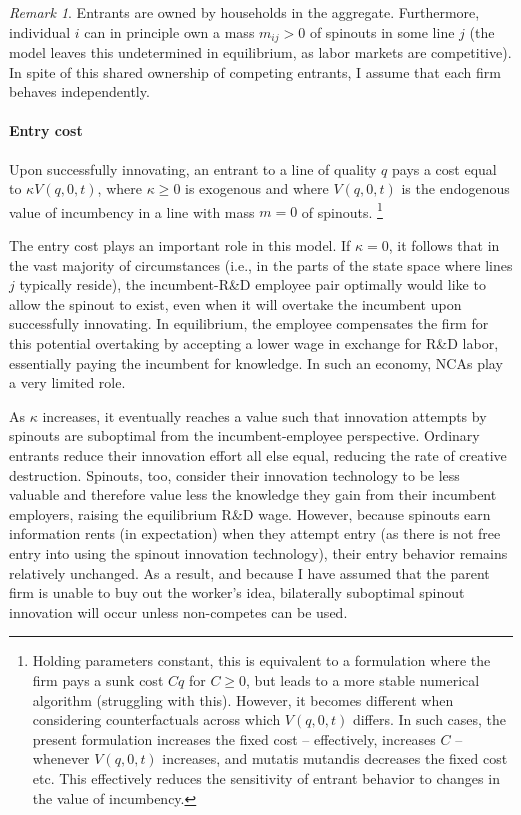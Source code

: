 \documentclass[12pt,english]{article}
\theoremstyle{remark}
\newtheorem{remark}{Remark}
\begin{document}
\begin{remark}
	Entrants are owned by households in the aggregate. Furthermore, individual $i$ can in principle own a mass $m_{ij} > 0$ of spinouts in some line $j$ (the model leaves this undetermined in equilibrium, as labor markets are competitive). In spite of this shared ownership of competing entrants, I assume that each firm behaves independently.
\end{remark}

\paragraph{Entry cost}

Upon successfully innovating, an entrant to a line of quality $q$ pays a cost equal to $\kappa V(q,0,t)$, where $\kappa \ge 0$ is exogenous and where $V(q,0,t)$ is the endogenous value of incumbency in a line with mass $m = 0$ of spinouts. \footnote{Holding parameters constant, this is equivalent to a formulation where the firm pays a sunk cost $Cq$ for $C \ge 0$, but leads to a more stable numerical algorithm (struggling with this). However, it becomes different when considering counterfactuals across which $V(q,0,t)$ differs. In such cases, the present formulation increases the fixed cost -- effectively, increases $C$ -- whenever $V(q,0,t)$ increases, and mutatis mutandis decreases the fixed cost etc. This effectively reduces the sensitivity of entrant behavior to changes in the value of incumbency.} 

The entry cost plays an important role in this model. If $\kappa = 0$, it follows that in the vast majority of circumstances (i.e., in the parts of the state space where lines $j$ typically reside), the incumbent-R\&D employee pair optimally would like to allow the spinout to exist, even when it will overtake the incumbent upon successfully innovating. In equilibrium, the employee compensates the firm for this potential overtaking by accepting a lower wage in exchange for R\&D labor, essentially paying the incumbent for knowledge. In such an economy, NCAs play a very limited role. 

As $\kappa$ increases, it eventually reaches a value such that innovation attempts by spinouts are suboptimal from the incumbent-employee perspective. Ordinary entrants reduce their innovation effort all else equal, reducing the rate of creative destruction. Spinouts, too, consider their innovation technology to be less valuable and therefore value less the knowledge they gain from their incumbent employers, raising the equilibrium R\&D wage. However, because spinouts earn information rents (in expectation) when they attempt entry (as there is not free entry into using the spinout innovation technology), their entry behavior remains relatively unchanged. As a result, and because I have assumed that the parent firm is unable to buy out the worker's idea, bilaterally suboptimal spinout innovation will occur unless non-competes can be used. 
\end{document}
